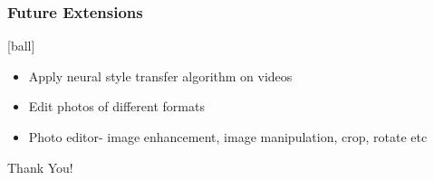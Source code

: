 \documentclass[14pt]{beamer}
\begin{document}
\begin{frame}
    \frametitle{Future Extensions}
    [ball]
    \begin{itemize}
    \item Apply neural style transfer algorithm on videos
    \item Edit photos of different formats
    \item Photo editor- image enhancement, image manipulation, crop, rotate etc
    \end{itemize}
\end{frame}

\begin{frame}
    \begin{center}  
       \Huge Thank You!
    \end{center}
\end{frame}
\end{document}
